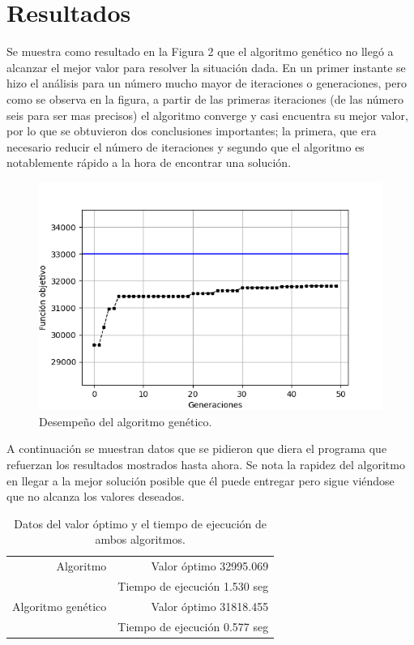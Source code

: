\documentclass[3pt,twocolumn]{elsarticle}
\begin{document}
\section{Resultados}
Se muestra como resultado en la Figura 2 que el algoritmo genético no llegó a alcanzar el mejor valor para resolver la situación dada. En un primer instante se hizo el análisis para un número mucho mayor de iteraciones o generaciones, pero como se observa en la figura, a partir de las primeras iteraciones (de las número seis para ser mas precisos) el algoritmo converge y casi encuentra su mejor valor, por lo que se obtuvieron dos conclusiones importantes; la primera, que era necesario reducir el número de iteraciones y segundo que el algoritmo es notablemente rápido a la hora de encontrar una solución.
\begin{figure}[ptb]
	\begin{center}
		\includegraphics[width=\linewidth]{Figure_1.png}
	\end{center}
	\caption{Desempeño del algoritmo genético.\label{rmsf}}
\end{figure}

A continuación se muestran datos que se pidieron que diera el programa que refuerzan los resultados mostrados hasta ahora. Se nota la rapidez del algoritmo en llegar a la mejor solución posible que él puede entregar pero sigue viéndose que no alcanza los valores deseados.
\begin{table}[h]
	\begin{center}
		\caption{Datos del valor óptimo y el tiempo de ejecución de ambos algoritmos.}
		\label{pdb}
		\begin{tabular}{r r}
			\hline
			Algoritmo & Valor óptimo 32995.069\\
			& Tiempo de ejecución 1.530 seg\\
			\hline
			Algoritmo genético & Valor óptimo 31818.455 \\
			& Tiempo de ejecución 0.577 seg\\
			\hline
		\end{tabular}
	\end{center}
\end{table}
\end{document}
